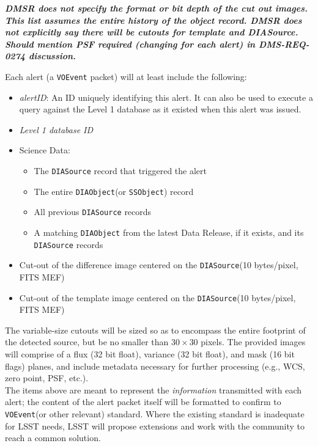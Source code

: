 \documentclass[12pt]{article}
\newcommand{\code}[1]{\texttt{#1}}
\newcommand{\annotate}[1]{{\color{magenta}\large\textbf{\emph{#1}}}}
\newcommand{\DIASource}{\code{DIASource}\xspace}
\newcommand{\DIAObject}{\code{DIAObject}\xspace}
\newcommand{\DB}{{Level 1 database}\xspace}
\newcommand{\SSObject}{\code{SSObject}\xspace}
\newcommand{\VOEvent}{\code{VOEvent}\xspace}
\newcommand{\req}[1]{\marginpar{\tiny #1}}
\newcommand{\dmreq}[1]{\req{DMS-REQ-#1}}
\begin{document}
\annotate{DMSR does not specify the format or bit depth of the cut out images. This list assumes the entire history of the object record. DMSR does not explicitly say there will be cutouts for template and DIASource. Should mention PSF required (changing for each alert) in DMS-REQ-0274 discussion.}

\vspace{1em}
Each alert (a \VOEvent packet) will at least include the following:

\begin{itemize}
\item {\em alertID}: An ID uniquely identifying this alert. It can also be used to execute a query against the \DB as it existed when this alert was issued.\dmreq{0274}
\item {\em \DB ID}   %
\item Science Data:
    \begin{itemize}
    \item The \DIASource record that triggered the alert
    \item The entire \DIAObject (or \SSObject) record
    \item All previous \DIASource records
    \item A matching \DIAObject from the latest Data Release, if it exists, and its \DIASource records
    \end{itemize}
\item Cut-out of the difference image centered on the \DIASource (10 bytes/pixel, FITS MEF)
\item Cut-out of the template image centered on the \DIASource (10 bytes/pixel, FITS MEF)
\end{itemize}

The variable-size cutouts will be sized so as to encompass the entire footprint of the detected source, but be no smaller than $30 \times 30$ pixels. The provided images will comprise of a flux (32 bit float), variance (32 bit float), and mask (16 bit flags) planes, and include metadata necessary for further processing (e.g., WCS, zero point, PSF, etc.).
\\

The items above are meant to represent the {\em information} transmitted with each alert; the content of the alert packet itself will be formatted to confirm to \VOEvent (or other relevant) standard. Where the existing standard is inadequate for LSST needs, LSST will propose extensions and work with the community to reach a common solution.
\end{document}
